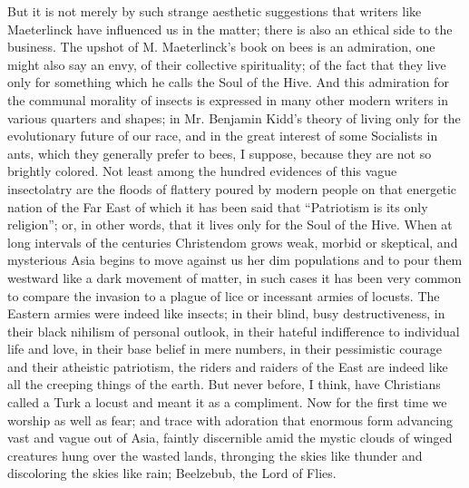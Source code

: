\documentclass{book}
\begin{document}
But it is not merely by such strange aesthetic suggestions that writers like Maeterlinck have influenced us in the matter; there is also an ethical side to the business. The upshot of M. Maeterlinck’s book on bees is an admiration, one might also say an envy, of their collective spirituality; of the fact that they live only for something which he calls the Soul of the Hive. And this admiration for the communal morality of insects is expressed in many other modern writers in various quarters and shapes; in Mr. Benjamin Kidd’s theory of living only for the evolutionary future of our race, and in the great interest of some Socialists in ants, which they generally prefer to bees, I suppose, because they are not so brightly colored. Not least among the hundred evidences of this vague insectolatry are the floods of flattery poured by modern people on that energetic nation of the Far East of which it has been said that “Patriotism is its only religion”; or, in other words, that it lives only for the Soul of the Hive. When at long intervals of the centuries Christendom grows weak, morbid or skeptical, and mysterious Asia begins to move against us her dim populations and to pour them westward like a dark movement of matter, in such cases it has been very common to compare the invasion to a plague of lice or incessant armies of locusts. The Eastern armies were indeed like insects; in their blind, busy destructiveness, in their black nihilism of personal outlook, in their hateful indifference to individual life and love, in their base belief in mere numbers, in their pessimistic courage and their atheistic patriotism, the riders and raiders of the East are indeed like all the creeping things of the earth. But never before, I think, have Christians called a Turk a locust and meant it as a compliment. Now for the first time we worship as well as fear; and trace with adoration that enormous form advancing vast and vague out of Asia, faintly discernible amid the mystic clouds of winged creatures hung over the wasted lands, thronging the skies like thunder and discoloring the skies like rain; Beelzebub, the Lord of Flies.
\end{document}
